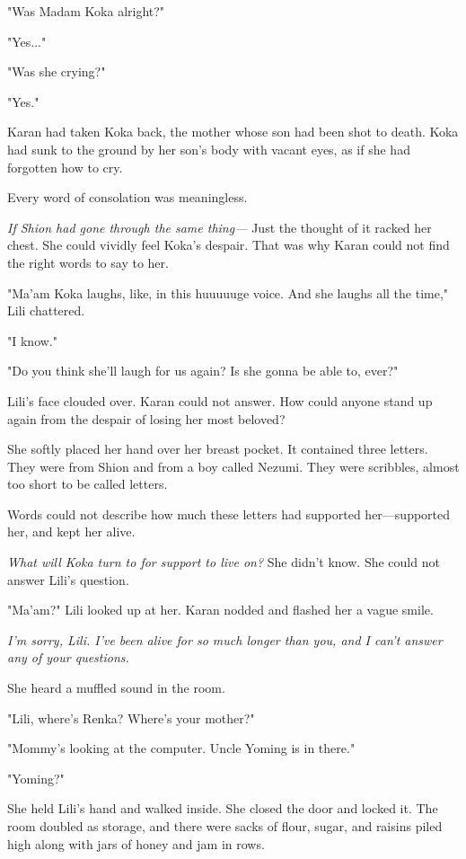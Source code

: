 "Was Madam Koka alright?"

"Yes..."

"Was she crying?"

"Yes."

Karan had taken Koka back, the mother whose son had been shot to death.
Koka had sunk to the ground by her son's body with vacant eyes, as if
she had forgotten how to cry.

Every word of consolation was meaningless.

\emph{If Shion had gone through the same thing---} Just the thought of it racked
her chest. She could vividly feel Koka's despair. That was why Karan
could not find the right words to say to her.

"Ma'am Koka laughs, like, in this huuuuuge voice. And she laughs all the
time," Lili chattered.

"I know."

"Do you think she'll laugh for us again? Is she gonna be able to, ever?"

Lili's face clouded over. Karan could not answer. How could anyone stand
up again from the despair of losing her most beloved?

She softly placed her hand over her breast pocket. It contained three
letters. They were from Shion and from a boy called Nezumi. They were
scribbles, almost too short to be called letters.




Words could not describe how much these letters had supported
her---supported her, and kept her alive.

\emph{What will Koka turn to for support to live on?} She didn't know. She
could not answer Lili's question.

"Ma'am?" Lili looked up at her. Karan nodded and flashed her a vague
smile.

\emph{I'm sorry, Lili. I've been alive for so much longer than you, and I
can't answer any of your questions.}

She heard a muffled sound in the room.

"Lili, where's Renka? Where's your mother?"

"Mommy's looking at the computer. Uncle Yoming is in there."

"Yoming?"

She held Lili's hand and walked inside. She closed the door and locked
it. The room doubled as storage, and there were sacks of flour, sugar,
and raisins piled high along with jars of honey and jam in rows.

